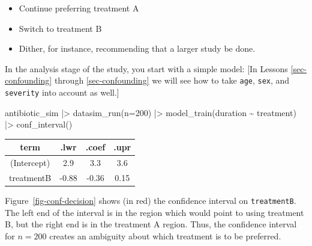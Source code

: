 \documentclass[
  letterpaper,
  DIV=11,
  numbers=noendperiod,
  oneside]{scrartcl}
\newenvironment{Shaded}{\begin{snugshade}}{\end{snugshade}}
\newcommand{\AttributeTok}[1]{\textcolor[rgb]{0.40,0.45,0.13}{#1}}
\newcommand{\DecValTok}[1]{\textcolor[rgb]{0.68,0.00,0.00}{#1}}
\newcommand{\FunctionTok}[1]{\textcolor[rgb]{0.28,0.35,0.67}{#1}}
\newcommand{\NormalTok}[1]{\textcolor[rgb]{0.00,0.23,0.31}{#1}}
\newcommand{\SpecialCharTok}[1]{\textcolor[rgb]{0.37,0.37,0.37}{#1}}
\providecommand{\tightlist}{%
  \setlength{\itemsep}{0pt}\setlength{\parskip}{0pt}}\usepackage{longtable,booktabs,array}
\begin{document}
\begin{itemize}
\tightlist
\item
  Continue preferring treatment A
\item
  Switch to treatment B
\item
  Dither, for instance, recommending that a larger study be done.
\end{itemize}

In the analysis stage of the study, you start with a simple model: {[}In
Lessons \ref{sec-confounding} through \ref{sec-confounding} we will see
how to take \texttt{age}, \texttt{sex}, and \texttt{severity} into
account as well.{]}

\begin{Shaded}
\begin{Highlighting}[]
\NormalTok{antibiotic\_sim }\SpecialCharTok{|\textgreater{}} \FunctionTok{datasim\_run}\NormalTok{(}\AttributeTok{n=}\DecValTok{200}\NormalTok{) }\SpecialCharTok{|\textgreater{}}
\FunctionTok{model\_train}\NormalTok{(duration }\SpecialCharTok{\textasciitilde{}}\NormalTok{ treatment) }\SpecialCharTok{|\textgreater{}} 
  \FunctionTok{conf\_interval}\NormalTok{()}
\end{Highlighting}
\end{Shaded}

\begin{longtable}[]{@{}cccc@{}}
\toprule\noalign{}
term & .lwr & .coef & .upr \\
\midrule\noalign{}
\endhead
\bottomrule\noalign{}
\endlastfoot
(Intercept) & 2.9 & 3.3 & 3.6 \\
treatmentB & -0.88 & -0.36 & 0.15 \\
\end{longtable}

Figure~\ref{fig-conf-decision} shows (in red) the confidence interval on
\texttt{treatmentB}. The left end of the interval is in the region which
would point to using treatment B, but the right end is in the treatment
A region. Thus, the confidence interval for \(n=200\) creates an
ambiguity about which treatment is to be preferred.
\end{document}

